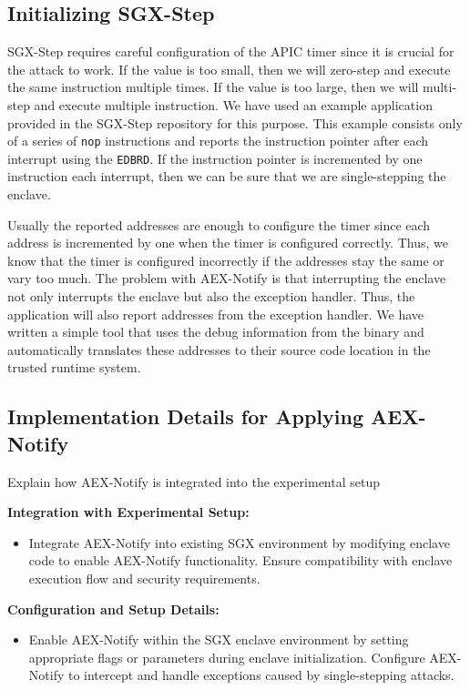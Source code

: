 \documentclass{llncs}
\begin{document}
\subsection{Initializing SGX-Step}

SGX-Step requires careful configuration of the APIC timer
since it is crucial for the attack to work.
If the value is too small, then we will zero-step and execute the same instruction multiple times.
If the value is too large, then we will multi-step and execute multiple instruction.
We have used an example application provided in the SGX-Step repository for this purpose.
This example consists only of a series of \texttt{nop} instructions and
reports the instruction pointer after each interrupt using the \texttt{EDBRD}.
If the instruction pointer is incremented by one instruction each interrupt,
then we can be sure that we are single-stepping the enclave.

Usually the reported addresses are enough to configure the timer
since each address is incremented by one when the timer is configured correctly.
Thus, we know that the timer is configured incorrectly if the addresses stay
the same or vary too much.
The problem with AEX-Notify is that interrupting the enclave not only
interrupts the enclave but also the exception handler.
Thus, the application will also report addresses from the exception handler.
We have written a simple tool that uses the debug information from the binary and
automatically translates these addresses to their source code location in the trusted runtime system.

\subsection{Implementation Details for Applying AEX-Notify}

Explain how AEX-Notify is integrated into the experimental setup

\textbf{Integration with Experimental Setup:}
\begin{itemize}
  \item
    Integrate AEX-Notify into existing SGX environment
    by modifying enclave code to enable AEX-Notify functionality.
    Ensure compatibility with enclave execution flow and security requirements.
\end{itemize}

\textbf{Configuration and Setup Details:}
\begin{itemize}
  \item Enable AEX-Notify within the SGX enclave environment
    by setting appropriate flags or parameters during enclave initialization.
    Configure AEX-Notify to intercept and handle exceptions caused by single-stepping attacks.
\end{itemize}
\end{document}

